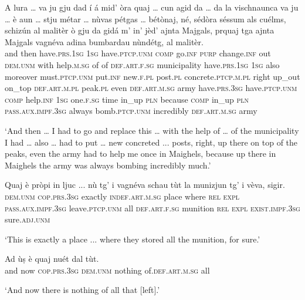 \begin{linenumbers}
\gll  A lura … va ju gju dad í á mid’ òra quaj … cun agid da … da la vischnaunca va ju … è aun … stju métar … nùvas pétgas … bétònaj\footnotemark,  né, sédòra  séssum als cuélms, schizún al malitèr ò gju da gidá m’ in’ jèd’ ajnta Majgals, prquaj tga ajnta Majgals vagnéva adina bumbardau nùndétg, al malitèr.\\
and then {} have.\textsc{prs.1sg} \textsc{1sg} have.\textsc{ptcp.unm} \textsc{comp} go.\textsc{inf} \textsc{purp} change.\textsc{inf} out \textsc{dem.unm} {} with help.\textsc{m.sg} of {} of  \textsc{def.art.f.sg} municipality have.\textsc{prs.1sg} \textsc{1sg} {} also moreover {} must.\textsc{ptcp.unm} put.\textsc{inf} {} new.\textsc{f.pl}  post.\textsc{pl} {} concrete.\textsc{ptcp.m.pl} right up\_out  on\_top \textsc{def.art.m.pl} peak.\textsc{pl} even \textsc{def.art.m.sg} army have.\textsc{prs.3sg} have.\textsc{ptcp.unm} \textsc{comp} help.\textsc{inf}  \textsc{1sg} one.\textsc{f.sg} time in\_up \textsc{pln} because \textsc{comp} in\_up \textsc{pln} \textsc{pass.aux.impf.3sg} always bomb.\textsc{ptcp.unm} incredibly \textsc{def.art.m.sg} army \\
\end{linenumbers}
\medskip
\glt `And then … I had to go and replace this … with the help of … of the municipality I had … also … had to put … new concreted ... posts, right, up there on top of the peaks, even the army had to help me once in Maighels, because up there in Maighels the army was always bombing incredibly much.'
\medskip

\begin{linenumbers}
\gll  Quaj è pròpi in ljuc ... nù tg’ i vagnéva schau tùt la munizjun tg’ i vèva, sigir.\\
 \textsc{dem.unm} \textsc{cop.prs.3sg} exactly \textsc{indef.art.m.sg} place {} where \textsc{rel} \textsc{expl} \textsc{pass.aux.impf.3sg} leave.\textsc{ptcp.unm} all \textsc{def.art.f.sg} munition \textsc{rel} \textsc{expl} \textsc{exist.impf.3sg} sure.\textsc{adj.unm}\\
\end{linenumbers}
\medskip
\glt `This is exactly a place ... where they stored all the munition, for sure.'
\medskip

\begin{linenumbers}
\gll  Ad ùṣ è quaj nuét dal tùt.   \\
and now \textsc{cop.prs.3sg} \textsc{dem.unm} nothing of.\textsc{def.art.m.sg} all  \\
\end{linenumbers}
\medskip
\glt `And now there is nothing of all that [left].'
\medskip

